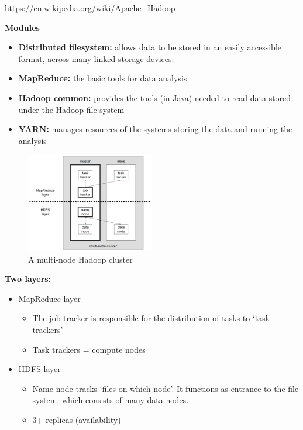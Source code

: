 \documentclass{article}
\begin{document}
\url{https://en.wikipedia.org/wiki/Apache_Hadoop}

\textbf{Modules}

\begin{itemize}
    \item \textbf{Distributed filesystem:} allows data to be stored in an easily accessible format, across many linked storage devices.
    \item \textbf{MapReduce:} the basic tools for data analysis
    \item \textbf{Hadoop common:} provides the tools (in Java) needed to read data stored under the Hadoop file system
    \item \textbf{YARN:} manages resources of the systems storing the data and running the analysis
\end{itemize}

\begin{figure}[H]
    \centering
    \includegraphics[width=0.5\textwidth]{hadoop.png}
    \caption{A multi-node Hadoop cluster}
\end{figure}

\textbf{Two layers:}

\begin{itemize}
    \item MapReduce layer
    \begin{itemize}
        \item The job tracker is responsible for the distribution of tasks to `task trackers'
        \item Task trackers = compute nodes
    \end{itemize}
    \item HDFS layer
    \begin{itemize}
        \item Name node tracks `files on which node'. It functions as entrance to the file system, which consists of many data nodes.
        \item 3+ replicas (availability)
    \end{itemize}
\end{itemize}
\end{document}
